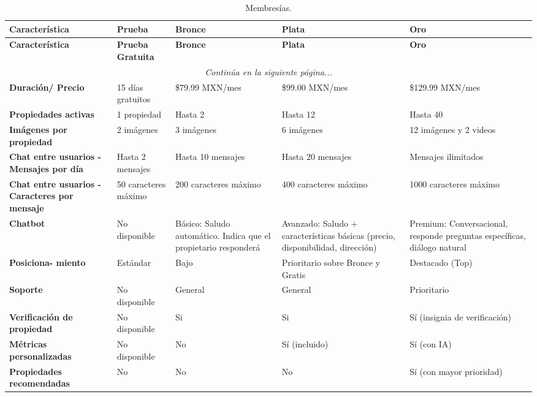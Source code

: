 \vspace{0.5cm}
\begin{center}
	\footnotesize
	\begin{longtable}{|p{2.5cm}|p{2.8cm}|p{2.8cm}|p{2.8cm}|p{2.8cm}|}
		\caption{Membresías.}
		\label{tab:mebresias} \\
		\hline
		\textbf{Característica} & \textbf{Prueba} & \textbf{Bronce} & \textbf{Plata} & \textbf{Oro} \\
		\hline
		\endfirsthead
		\hline
		\textbf{Característica} & \textbf{Prueba Gratuita} & \textbf{Bronce} & \textbf{Plata} & \textbf{Oro} \\
		\hline
		\endhead
		\hline
		\multicolumn{5}{|c|}{\textit{Continúa en la siguiente página...}} \\
		\hline
		\endfoot
		\hline
		\endlastfoot
		\textbf{Duración/ Precio} & 15 días gratuitos & \$79.99 MXN/mes & \$99.00 MXN/mes & \$129.99 MXN/mes \\
		\hline
		\textbf{Propiedades activas} & 1 propiedad & Hasta 2 & Hasta 12 & Hasta 40 \\
		\hline
		\textbf{Imágenes por propiedad} & 2 imágenes & 3 imágenes & 6 imágenes & 12 imágenes y 2 videos \\
		\hline
		\textbf{Chat entre usuarios - Mensajes por día} & Hasta 2 mensajes & Hasta 10 mensajes & Hasta 20 mensajes & Mensajes ilimitados \\
		\hline
		\textbf{Chat entre usuarios - Caracteres por mensaje} & 50 caracteres máximo & 200 caracteres máximo & 400 caracteres máximo & 1000 caracteres máximo \\
		\hline
		\textbf{Chatbot} & No disponible & Básico: Saludo automático. Indica que el propietario responderá & Avanzado: Saludo + características básicas (precio, disponibilidad, dirección) & Premium: Conversacional, responde preguntas específicas, diálogo natural \\
		\hline
		\textbf{Posiciona- miento} & Estándar & Bajo & Prioritario sobre Bronce y Gratis & Destacado (Top) \\
		\hline
		\textbf{Soporte} & No disponible & General & General & Prioritario \\
		\hline
		\textbf{Verificación de propiedad} & No disponible & Si & Si & Sí (insignia de verificación) \\
		\hline
		\textbf{Métricas personalizadas} & No disponible & No & Sí (incluido) & Sí (con IA) \\
		\hline
		\textbf{Propiedades recomendadas} & No & No & No & Sí (con mayor prioridad) \\
		\hline
	\end{longtable}
\end{center}

\singlespacing 